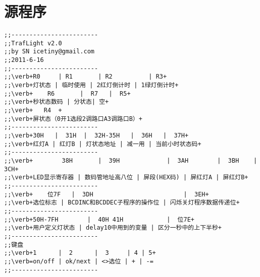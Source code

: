 
\chapter{源程序}
\label{app:code}
\begin{lstlisting}[language={[x86masm]assembler},escapeinside=""]
;;------------------------
;;TrafLight v2.0
;;by SN icetiny@gmail.com
;;2011-6-16
;;------------------------
;;\verb+R0     | R1       | R2          | R3+
;;\verb+灯状态 | 临时使用 | 2红灯倒计时 | 1绿灯倒计时+    
;;\verb+	R6       |  R7   |  R5+		
;;\verb+秒状态数码 | 分状态| 空+
;;\verb+   R4  +
;;\verb+屏状态（0开1选段2调路口A3调路口B）+
;;------------------------
;;\verb+30H   |  31H  |  32H-35H   |  36H   |  37H+
;;\verb+红灯A | 红灯B | 灯状态地址 | 减一用 | 当前小时状态码+
;;------------------------
;;\verb+		38H       |  39H             |  3AH        |  3BH    |  3CH+	
;;\verb+LED显示寄存器 | 数码管地址高八位 | 屏段(HEX码) | 屏红灯A | 屏红灯B+
;;------------------------
;;\verb+	位7F   |  3DH                         |  3EH+
;;\verb+选位标志 | BCDINC和BCDDEC子程序的操作位 | 闪烁关灯程序数据传递位+
;;------------------------
;;\verb+50H-7FH        |  40H 41H            |  位7E+
;;\verb+用户定义灯状态 | delay10中用到的变量 | 区分一秒中的上下半秒+
;;------------------------
;;键盘
;;\verb+1      |  2      |  3     | 4 | 5+
;;\verb=on/off | ok/next | <>选位 | + | -=
;;------------------------


\end{lstlisting}
